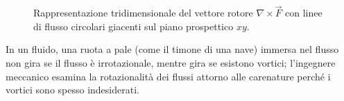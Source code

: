 \documentclass[11pt,a4paper]{article}
\begin{document}
\begin{figure}[htbp]
	\caption{Rappresentazione tridimensionale del vettore rotore $\nabla \times \vec{F}$ con linee di flusso circolari giacenti sul piano prospettico $xy$.}
	\label{fig:rotore_3d_prospettiva_reale}
\end{figure}

In un fluido, una ruota a pale (come il timone di una nave) immersa nel flusso non gira se il flusso è irrotazionale, mentre gira se esistono vortici; l'ingegnere meccanico esamina la rotazionalità dei flussi attorno alle carenature perché i vortici sono spesso indesiderati.
\end{document}
